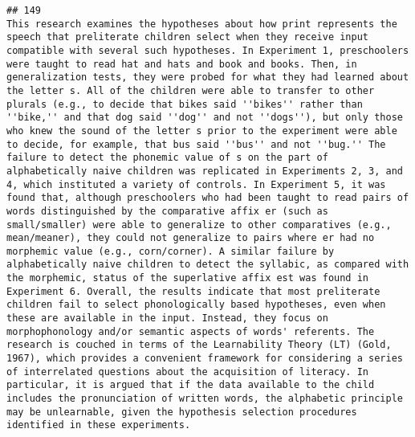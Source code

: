 \documentclass[
  english,
  man]{apa6}
\begin{document}
\begin{verbatim}
## 149                                                                                                                                                                                                                                                                                                                                                                                                                                                                                                                                                                                    This research examines the hypotheses about how print represents the speech that preliterate children select when they receive input compatible with several such hypotheses. In Experiment 1, preschoolers were taught to read hat and hats and book and books. Then, in generalization tests, they were probed for what they had learned about the letter s. All of the children were able to transfer to other plurals (e.g., to decide that bikes said ''bikes'' rather than ''bike,'' and that dog said ''dog'' and not ''dogs''), but only those who knew the sound of the letter s prior to the experiment were able to decide, for example, that bus said ''bus'' and not ''bug.'' The failure to detect the phonemic value of s on the part of alphabetically naive children was replicated in Experiments 2, 3, and 4, which instituted a variety of controls. In Experiment 5, it was found that, although preschoolers who had been taught to read pairs of words distinguished by the comparative affix er (such as small/smaller) were able to generalize to other comparatives (e.g., mean/meaner), they could not generalize to pairs where er had no morphemic value (e.g., corn/corner). A similar failure by alphabetically naive children to detect the syllabic, as compared with the morphemic, status of the superlative affix est was found in Experiment 6. Overall, the results indicate that most preliterate children fail to select phonologically based hypotheses, even when these are available in the input. Instead, they focus on morphophonology and/or semantic aspects of words' referents. The research is couched in terms of the Learnability Theory (LT) (Gold, 1967), which provides a convenient framework for considering a series of interrelated questions about the acquisition of literacy. In particular, it is argued that if the data available to the child includes the pronunciation of written words, the alphabetic principle may be unlearnable, given the hypothesis selection procedures identified in these experiments.

\end{verbatim}
\end{document}

